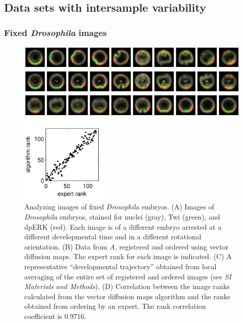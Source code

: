 \documentclass[twocolumn, 10pt]{article}
\newcommand{\SI}[0]{\textit{SI Materials and Methods}}
\begin{document}
\subsection*{Data sets with intersample variability}

\subsubsection*{Fixed {\em Drosophila} images}

\begin{figure}[t]
\begin{minipage}[b]{12cm}
\includegraphics[width=12.25cm]{drosophila_fixed_images_scrambled}

\includegraphics[width=12.25cm]{drosophila_fixed_images_ordered}

\includegraphics[width=12.25cm]{drosophila_fixed_images_average}
\end{minipage}
%
\hfill
%
\includegraphics[width=4.25cm]{drosophila_fixed_images_rank_corr}
%
\caption{Analyzing images of fixed \textit{Drosophila} embryos. {(A)} Images of \textit{ Drosophila} embryos, stained for nuclei (gray), Twi (green), and dpERK (red). Each image is of a different embryo arrested at a different developmental time and in a different rotational orientation. {(B)} Data from {\it A}, registered and ordered using vector diffusion maps. The expert rank for each image is indicated. {(C)} A representative ``developmental trajectory'' obtained from local averaging of the entire set of registered and ordered images (see \SI). {(D)} Correlation between the image ranks calculated from the vector diffusion maps algorithm and the ranks obtained from ordering by an expert. The rank correlation coefficient is $0.9716$. }
\label{fig:drosophila_fixed_images}
\end{figure}
\end{document}
